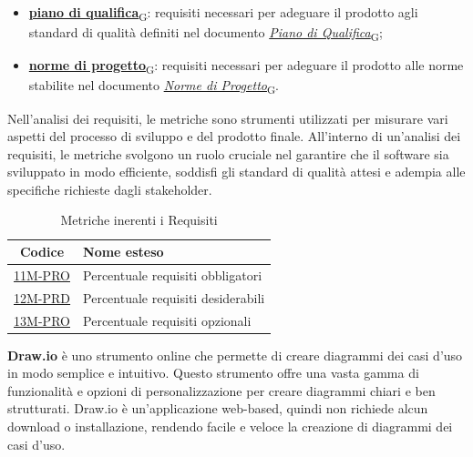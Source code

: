 \begin{enumerate}
\begin{itemize}
		      \item \href{https://7last.github.io/docs/rtb/documentazione-interna/glossario\#piano-di-qualifica}{\textbf{piano di qualifica}\textsubscript{G}}: requisiti necessari per adeguare il prodotto agli standard di qualità definiti nel documento \href{https://7last.github.io/docs/rtb/documentazione-interna/glossario\#piano-di-qualifica}{\textit{Piano di Qualifica}\textsubscript{G}};
		      \item \href{https://7last.github.io/docs/rtb/documentazione-interna/glossario\#norme-di-progetto}{\textbf{norme di progetto}\textsubscript{G}}: requisiti necessari per adeguare il prodotto alle norme stabilite nel documento \href{https://7last.github.io/docs/rtb/documentazione-interna/glossario\#norme-di-progetto}{\textit{Norme di Progetto}\textsubscript{G}}.
	      \end{itemize}
\end{enumerate}

Nell'analisi dei requisiti, le metriche sono strumenti utilizzati per misurare vari aspetti del processo di sviluppo e del prodotto finale. All'interno di un'analisi dei requisiti, le metriche svolgono un ruolo cruciale nel garantire che il software sia sviluppato in modo efficiente, soddisfi gli standard di qualità attesi e adempia alle specifiche richieste dagli stakeholder.
\begin{table}[!h]
	\centering
	\begin{tabular}{ | c | l | }
		\hline
		\textbf{Codice}                      & \textbf{Nome esteso}               \\
		\hline
		\underline{\hyperlink{11M}{11M-PRO}} & Percentuale requisiti obbligatori  \\
		\underline{\hyperlink{12M}{12M-PRD}} & Percentuale requisiti desiderabili \\
		\underline{\hyperlink{13M}{13M-PRO}} & Percentuale requisiti opzionali    \\
		\hline
	\end{tabular}
	\caption{Metriche inerenti i Requisiti}
\end{table}

\textbf{Draw.io} è uno strumento online che permette di creare diagrammi dei casi d'uso in modo semplice e intuitivo. Questo strumento offre una vasta gamma di funzionalità e opzioni di personalizzazione per creare diagrammi chiari e ben strutturati. Draw.io è un'applicazione web-based, quindi non richiede alcun download o installazione, rendendo facile e veloce la creazione di diagrammi dei casi d'uso.

